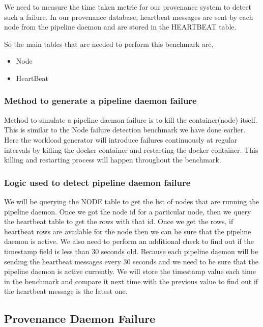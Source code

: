 We need to measure the time taken metric for our provenance system to detect such a failure. In our provenance database, heartbeat messages are sent by each node from the pipeline daemon and are stored in the HEARTBEAT table.

So the main tables that are needed to perform this benchmark are,
    \begin{itemize}
        \item Node
        \item HeartBeat
    \end{itemize}

\subsubsection{Method to generate a pipeline daemon failure}

Method to simulate a pipeline daemon failure is to kill the container(node) itself. This is similar to the Node failure detection benchmark we have done earlier. Here the workload generator will introduce failures continuously at regular intervals by killing the docker container and restarting the docker container. This killing and restarting process will happen throughout the benchmark.

\subsubsection{Logic used to detect pipeline daemon failure}

We will be querying the NODE table to get the list of nodes that are running the pipeline daemon. Once we got the node id for a particular node, then we query the heartbeat table to get the rows with that id. 
Once we get the rows, if heartbeat rows are available for the node then we can be sure that the pipeline daemon is active. We also need to perform an additional check to find out if the timestamp field is less than 30 seconds old. Because each pipeline daemon will be sending the heartbeat messages every 30 seconds and we need to be sure that the pipeline daemon is active currently. We will store the timestamp value each time in the benchmark and compare it next time with the previous value to find out if the heartbeat message is the latest one.

\subsection{Provenance Daemon Failure}

